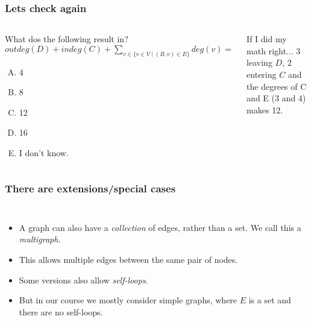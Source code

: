 \begin{frame}
	\frametitle{Lets check again}
	\begin{columns}
			
	\begin{questionblock}{What dos the following result in?}
	\pause
		$\mathit{outdeg}(D) + \mathit{indeg}(C) + \sum\limits_{v\in \{v \in V \mid (B,v) \in E\}} \mathit{deg}(v) = $
		\begin{enumerate}[A.]
			\item 4
			\item 8
			\item 12
			\item 16
			\item I don't know.
		\end{enumerate}
	\end{questionblock}
	\pause
	\begin{answerblock}{If I did my math right...}
		3 leaving $D$, 2 entering $C$ and the degrees of C and E (3 and 4) makes 12.
	\end{answerblock}
	\end{columns}
\end{frame}

\begin{frame}
	\frametitle{There are extensions/special cases}
	\begin{columns}
		\column{0.405\textwidth}
			
		\column{0.605\textwidth}
		\begin{itemize}
			\item A graph can also have a \textit{collection} of edges, rather than a set. We call this a \textit{multigraph}.
				\pause
			\item This allows multiple edges between the same pair of nodes.
				\pause
			\item Some versions also allow \textit{self-loops}.
				\pause
			\item But in our course we mostly consider \alert{simple} graphs, where $E$ is a set and there are no self-loops.
		\end{itemize}
	\end{columns}
\end{frame}

